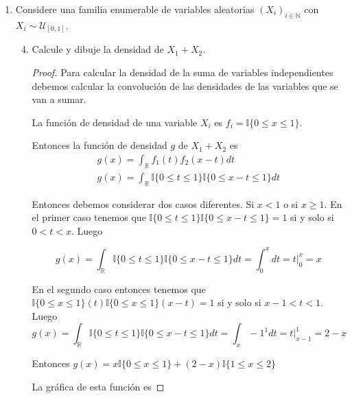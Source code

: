 \documentclass[paper=letter, fontsize=11pt]{scrartcl} %
\numberwithin{equation}{section} %
\numberwithin{figure}{section} %
\numberwithin{table}{section} %
\begin{document}
\begin{enumerate}[label = \Alph*)]
\begin{proof}
\begin{enumerate}[label = \arabic*)]
Entonces el parametro para completar la distribución es $ c = \sqrt{5}+1 $.
\end{enumerate}

\end{proof}
\item Considere una familia enumerable de variables aleatorias $ (X_i)_{i \in \mathbb{N}} $ con $ X_i \sim \mathcal{U}_{[0,1]}  $.
\begin{enumerate}[label = \arabic*)]
	\setcounter{enumii}{3}
\item Calcule y dibuje la densidad de $ X_1 + X_2 $.
\begin{proof}
Para calcular la densidad de la suma de variables independientes debemos calcular la convolución de las densidades de las variables que se van a sumar.

La función de densidad de una variable $ X_i $ es $ f_i=\mathbb{I}\{0 \leq x \leq 1\}  $.

Entonces la función de densidad $ g $ de $ X_1 + X_2 $ es
\begin{eqnarray}
g(x)= \int_{\mathbb{R}} f_1(t)f_2(x-t)dt \nonumber
\\g(x)= \int_{\mathbb{R}} \mathbb{I}\{0 \leq t \leq 1\}\mathbb{I}\{0 \leq x-t \leq 1\}dt \nonumber
\end{eqnarray}

Entonces debemos considerar dos casos diferentes. Si $ x < 1 $ o si $ x \geq 1$. En el primer caso tenemos que $ \mathbb{I}\{0 \leq t \leq 1\}\mathbb{I}\{0 \leq x-t \leq 1\} = 1 $ si y solo si $ 0<t<x $. Luego

\begin{equation}
g(x)= \int_{\mathbb{R}} \mathbb{I}\{0 \leq t \leq 1\}\mathbb{I}\{0 \leq x-t \leq 1\}dt = \int_0^x dt = t\bigg|_0^x=x \nonumber
\end{equation}

En el segundo caso entonces tenemos que $ \mathbb{I}\{0 \leq x \leq 1\}(t)\mathbb{I}\{0 \leq x \leq 1\}(x-t) = 1 $ si y solo si $ x-1<t<1 $. Luego
\begin{equation}
g(x)= \int_{\mathbb{R}} \mathbb{I}\{0 \leq t \leq 1\}\mathbb{I}\{0 \leq x-t \leq 1\}dt = \int_x-1^1 dt = t\bigg|_{x-1}^1=2-x \nonumber
\end{equation}

Entonces $ g(x) = x\mathbb{I}\{0\leq x \leq 1\} +(2-x)\mathbb{I}\{1\leq x \leq 2\} $

La gráfica de esta función es


\end{proof}
\end{enumerate}
\end{enumerate}
\end{document}
